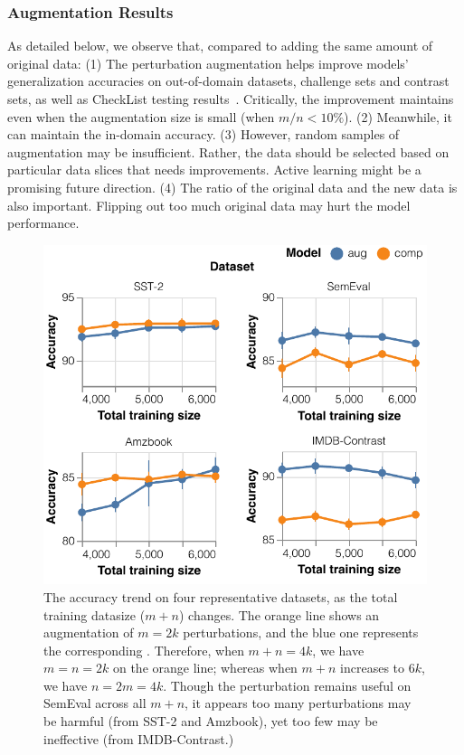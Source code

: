 \subsubsection{Augmentation Results}
As detailed below, we observe that, compared to adding the same amount of original data: 
(1) The perturbation augmentation helps improve models' generalization accuracies on out-of-domain datasets, challenge sets and contrast sets, as well as CheckList testing results~\cite{checklist:acl20}.
Critically, the improvement maintains even when the augmentation size is small (\eg when $m/n<10\%$).
(2) Meanwhile, it can maintain the in-domain accuracy.
(3) However, random samples of augmentation may be insufficient. Rather, the data should be selected based on particular data slices that needs improvements. 
Active learning might be a promising future direction.
(4) The ratio of the original data and the new data is also important. Flipping out too much original data may hurt the model performance.




\begin{figure}[t]
\centering
\includegraphics[width=1\columnwidth]{figures/sst_trend}
\vspace{-15pt}
\caption{The accuracy trend on four representative datasets, as the total training datasize ($m+n$) changes. The orange line shows an augmentation of $m=2k$ perturbations, and the blue one represents the corresponding \mcomp.
Therefore, when $m+n=4k$, we have $m=n=2k$ on the orange line; whereas when $m+n$ increases to $6k$, we have $n=2m=4k$.
Though the perturbation remains useful on SemEval across all $m+n$, it appears too many perturbations may be harmful (from SST-2 and Amzbook), yet too few may be ineffective (from IMDB-Contrast.)
}
\vspace{-10pt}
\label{fig:sst_trend}
\end{figure}


